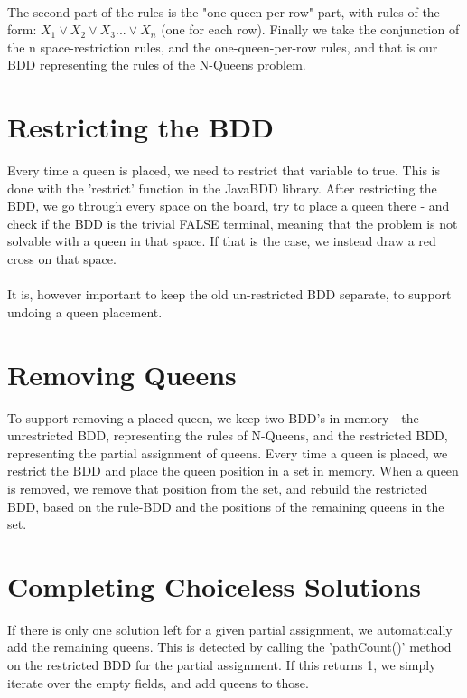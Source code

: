 \documentclass{llncs}
\begin{document}
\paragraph{}
The second part of the rules is the "one queen per row" part, with rules of the form:
$X_1 \lor X_2 \lor X_3 ... \lor X_n$ (one for each row). Finally we take the conjunction of the n space-restriction rules, and the one-queen-per-row rules, and that is our BDD representing the rules of the N-Queens problem.
\section{Restricting the BDD}
Every time a queen is placed, we need to restrict that variable to true. This is done with the 'restrict' function in the JavaBDD library. After restricting the BDD, we go through every space on the board, try to place a queen there - and check if the BDD is the trivial FALSE terminal, meaning that the problem is not solvable with a queen in that space. If that is the case, we instead draw a red cross on that space.
\paragraph{}
It is, however important to keep the old un-restricted BDD separate, to support undoing a queen placement.
\section{Removing Queens}
To support removing a placed queen, we keep two BDD's in memory - the unrestricted BDD, representing the rules of N-Queens, and the restricted BDD, representing the partial assignment of queens. Every time a queen is placed, we restrict the BDD and place the queen position in a set in memory. When a queen is removed, we remove that position from the set, and rebuild the restricted BDD, based on the rule-BDD and the positions of the remaining queens in the set.
\section{Completing Choiceless Solutions}
If there is only one solution left for a given partial assignment, we automatically add the remaining queens. This is detected by calling the 'pathCount()' method on the restricted BDD for the partial assignment. If this returns 1, we simply iterate over the empty fields, and add queens to those.
\end{document}
